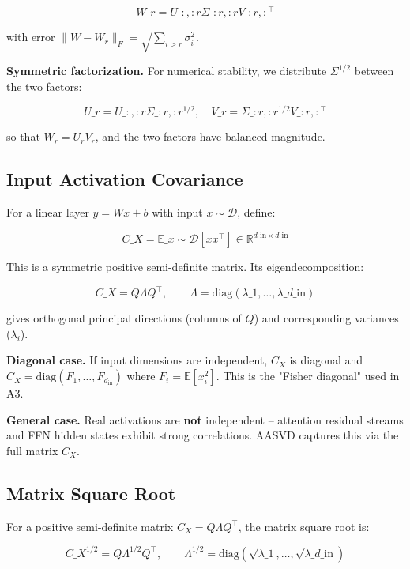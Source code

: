 \[
W\_r = U\_{:, :r} \Sigma\_{:r, :r} V\_{:r, :}^\top
\tag{3.2}
\]

with error $\|W - W_r\|_F = \sqrt{\sum_{i > r} \sigma_i^2}$.

\textbf{Symmetric factorization.} For numerical stability, we distribute 
$\Sigma^{1/2}$ between the two factors:

\[
U\_r = U\_{:, :r} \Sigma\_{:r, :r}^{1/2}, \quad
V\_r = \Sigma\_{:r, :r}^{1/2} V\_{:r, :}^\top
\tag{3.3}
\]

so that $W_r = U_r V_r$, and the two factors have balanced magnitude.

\subsection{Input Activation Covariance}

For a linear layer $y = Wx + b$ with input $x \sim \mathcal{D}$, define:

\[
C\_X = \mathbb{E}\_{x \sim \mathcal{D}}\!\left[x x^\top\right] \in \mathbb{R}^{d\_\text{in} \times d\_\text{in}}
\tag{3.4}
\]

This is a symmetric positive semi-definite matrix. Its eigendecomposition:

\[
C\_X = Q \Lambda Q^\top, \qquad
\Lambda = \mathrm{diag}(\lambda\_1, \dots, \lambda\_{d\_\text{in}})
\tag{3.5}
\]

gives orthogonal principal directions (columns of $Q$) and corresponding 
variances ($\lambda_i$).

\textbf{Diagonal case.} If input dimensions are independent, $C_X$ is diagonal and 
$C_X = \mathrm{diag}(F_1, \dots, F_{d_\text{in}})$ where $F_i = \mathbb{E}[x_i^2]$. 
This is the "Fisher diagonal" used in A3.

\textbf{General case.} Real activations are \textbf{not} independent -- attention 
residual streams and FFN hidden states exhibit strong correlations. AASVD 
captures this via the full matrix $C_X$.

\subsection{Matrix Square Root}

For a positive semi-definite matrix $C_X = Q \Lambda Q^\top$, the matrix 
square root is:

\[
C\_X^{1/2} = Q \Lambda^{1/2} Q^\top, \qquad
\Lambda^{1/2} = \mathrm{diag}(\sqrt{\lambda\_1}, \dots, \sqrt{\lambda\_{d\_\text{in}}})
\tag{3.6}
\]

